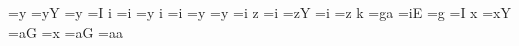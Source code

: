 {     \t@kenbuffer=\expandafter{\the\t@kenbuffer y}%
    \else%
     \t@kenbuffer=\expandafter{\the\t@kenbuffer yY}%
    \fi%
   \else%
    \ifpreviousisboundary%
     \t@kenbuffer=\expandafter{\the\t@kenbuffer y}%
    \else%
     \iffollowingispseudoboundary
      \t@kenbuffer=\expandafter{\the\t@kenbuffer I}%
     \else
      \if\followingchar i%
       \ifcase\thisfvs
	\t@kenbuffer=\expandafter{\the\t@kenbuffer i}%
       \or
	\t@kenbuffer=\expandafter{\the\t@kenbuffer y}%
       \fi%
      \else
       \if\previouschar i%
        \ifcase\thisfvs
         \t@kenbuffer=\expandafter{\the\t@kenbuffer i}%
	\or
         \t@kenbuffer=\expandafter{\the\t@kenbuffer y}%
	\fi
       \else
        \ifcase\thisfvs
         \t@kenbuffer=\expandafter{\the\t@kenbuffer y}%
	\or 
         \t@kenbuffer=\expandafter{\the\t@kenbuffer i}%
	\fi
       \fi
      \fi
     \fi
    \fi
   \fi
  \else \if\thischar z%
   \iffollowingisboundary%
    \ifpreviousisboundary%
     \t@kenbuffer=\expandafter{\the\t@kenbuffer i}%
    \else%
     \t@kenbuffer=\expandafter{\the\t@kenbuffer zY}%
    \fi%
   \else%
    \ifpreviousisboundary%
     \t@kenbuffer=\expandafter{\the\t@kenbuffer i}%
    \else%
     \t@kenbuffer=\expandafter{\the\t@kenbuffer z}%
    \fi
   \fi
  \else \if\thischar k%
   \iffollowingisboundary%
    \ifpreviousisboundary%
     \t@kenbuffer=\expandafter{\the\t@kenbuffer ga}%
    \else%
     \t@kenbuffer=\expandafter{\the\t@kenbuffer iE}%
    \fi%
   \else%
    \iffollowingforcesround %
     \t@kenbuffer=\expandafter{\the\t@kenbuffer g}%
    \else
     \t@kenbuffer=\expandafter{\the\t@kenbuffer I}%
    \fi
   \fi
  \else \if\thischar x%
   \iffollowingisboundary%
    \ifpreviousisboundary%
     \t@kenbuffer=\expandafter{\the\t@kenbuffer xY}%
    \else%
     \t@kenbuffer=\expandafter{\the\t@kenbuffer aG}%
    \fi%
   \else%
    \ifpreviousisboundary%
     \t@kenbuffer=\expandafter{\the\t@kenbuffer x}%
    \else%
     \iffollowingispseudoboundary
      \t@kenbuffer=\expandafter{\the\t@kenbuffer aG}%
     \else
      \t@kenbuffer=\expandafter{\the\t@kenbuffer aa}%
     \fi
    \fi
   \fi%
}
